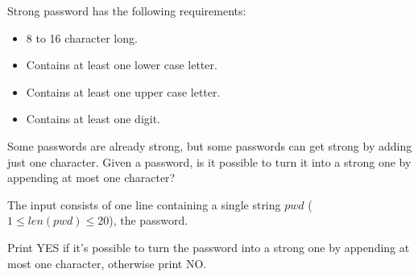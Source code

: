 \problemname{\problemyamlname}


\newcommand{\minlen}{1}
\newcommand{\maxlen}{20}

Strong password has the following requirements:
\begin{itemize}
\item 8 to 16 character long.
\item Contains at least one lower case letter.
\item Contains at least one upper case letter.
\item Contains at least one digit.
\end{itemize}

Some passwords are already strong, but some passwords can get strong by adding just one character.
Given a password, is it possible to turn it into a strong one by appending at most one character?

\begin{Input}
    The input consists of one line containing a single string $pwd$ ($\minlen \leq len(pwd)\leq \maxlen$), the password.
\end{Input}

\begin{Output}
    Print YES if it's possible to turn the password into a strong one by appending at most one character, otherwise print NO.
\end{Output}
